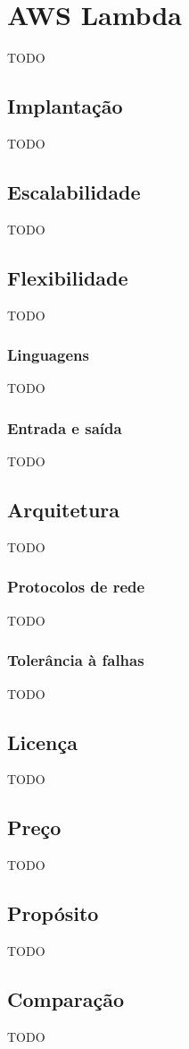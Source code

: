 \section{AWS Lambda}

TODO

\subsection{Implantação}

TODO

\subsection{Escalabilidade}

TODO

\subsection{Flexibilidade}

TODO

\subsubsection{Linguagens}

TODO

\subsubsection{Entrada e saída}

TODO

\subsection{Arquitetura}

TODO

\subsubsection{Protocolos de rede}

TODO

\subsubsection{Tolerância à falhas}

TODO

\subsection{Licença}

TODO

\subsection{Preço}

TODO

\subsection{Propósito}

TODO

\subsection{Comparação}

TODO
